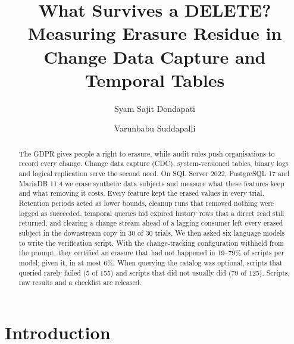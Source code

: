 \documentclass[runningheads]{llncs}
\begin{document}
\title{What Survives a DELETE? Measuring Erasure Residue in Change Data Capture and Temporal Tables}

\author{Syam Sajit Dondapati \and
Varunbabu Suddapalli}

\maketitle

\begin{abstract}
The GDPR gives people a right to erasure, while audit rules push organisations
to record every change. Change data capture (CDC), system-versioned tables,
binary logs and logical replication serve the second need. On SQL Server 2022, PostgreSQL 17 and MariaDB 11.4 we erase
synthetic data subjects and measure what these features keep and what removing
it costs. Every feature kept the erased values in every trial. Retention
periods acted as lower bounds, cleanup runs that removed nothing were logged as
succeeded, temporal queries hid expired history rows that a direct read still
returned, and clearing a change stream ahead of a lagging consumer left every
erased subject in the downstream copy in 30 of 30 trials. We then asked six
language models to write the verification script. With the change-tracking
configuration withheld from the prompt, they certified an erasure that had not happened in 19--79\% of scripts per model;
given it, in at most 6\%. When querying the
catalog was optional, scripts that queried rarely failed (5 of 155) and scripts
that did not usually did (79 of 125). Scripts, raw results and a checklist are
released.

\end{abstract}

\section{Introduction}
\end{document}
